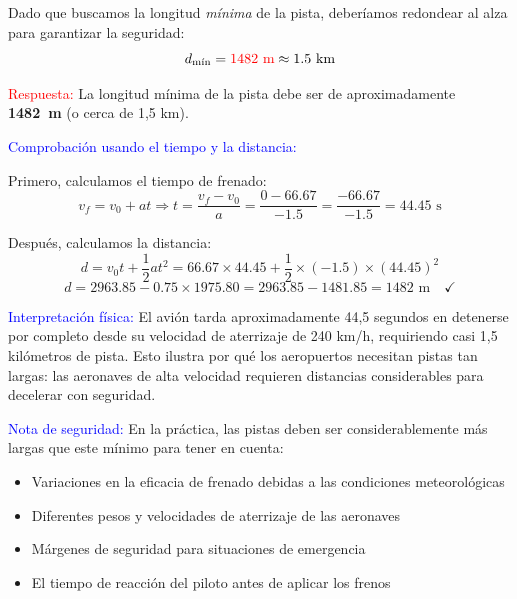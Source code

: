 \begin{exercise}
\begin{solu}
        Dado que buscamos la longitud \textit{mínima} de la pista, deberíamos redondear al alza para garantizar la seguridad:
        \[
            d_{\text{mín}} = \textcolor{red}{1482 \text{ m}} \approx 1.5 \text{ km}
        \]

        \textcolor{red}{Respuesta:} La longitud mínima de la pista debe ser de aproximadamente \textbf{\qty{1482}{\m}} (o cerca de 1,5 km).

        \vspace{0.3cm}

        \textcolor{blue}{Comprobación usando el tiempo y la distancia:}

        Primero, calculamos el tiempo de frenado:
        \[
            v_f = v_0 + at \Rightarrow t = \frac{v_f - v_0}{a} = \frac{0 - 66.67}{-1.5} = \frac{-66.67}{-1.5} = 44.45 \text{ s}
        \]

        Después, calculamos la distancia:
        \[
            d = v_0 t + \frac{1}{2}at^2 = 66.67 \times 44.45 + \frac{1}{2} \times (-1.5) \times (44.45)^2
        \]
        \[
            d = 2963.85 - 0.75 \times 1975.80 = 2963.85 - 1481.85 = 1482 \text{ m} \quad \checkmark
        \]

        \textcolor{blue}{Interpretación física:} El avión tarda aproximadamente 44,5 segundos en detenerse por completo desde su velocidad de aterrizaje de 240 km/h, requiriendo casi 1,5 kilómetros de pista. Esto ilustra por qué los aeropuertos necesitan pistas tan largas: las aeronaves de alta velocidad requieren distancias considerables para decelerar con seguridad.

        \textcolor{blue}{Nota de seguridad:} En la práctica, las pistas deben ser considerablemente más largas que este mínimo para tener en cuenta:
        \begin{itemize}
            \item Variaciones en la eficacia de frenado debidas a las condiciones meteorológicas
            \item Diferentes pesos y velocidades de aterrizaje de las aeronaves
            \item Márgenes de seguridad para situaciones de emergencia
            \item El tiempo de reacción del piloto antes de aplicar los frenos
        \end{itemize}
    \end{solu}
\end{exercise}

